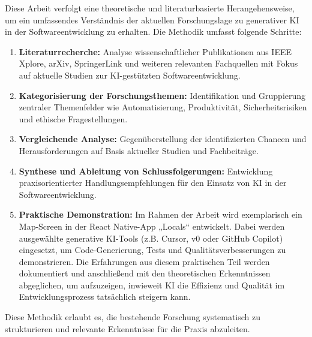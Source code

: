 Diese Arbeit verfolgt eine theoretische und literaturbasierte Herangehensweise, um ein umfassendes Verständnis der aktuellen Forschungslage zu generativer KI in der Softwareentwicklung zu erhalten. Die Methodik umfasst folgende Schritte:
\begin{enumerate}
    \item \textbf{Literaturrecherche:} Analyse wissenschaftlicher Publikationen aus IEEE Xplore, arXiv, SpringerLink und weiteren relevanten Fachquellen mit Fokus auf aktuelle Studien zur KI-gestützten Softwareentwicklung.
    \item \textbf{Kategorisierung der Forschungsthemen:} Identifikation und Gruppierung zentraler Themenfelder wie Automatisierung, Produktivität, Sicherheitsrisiken und ethische Fragestellungen.
    \item \textbf{Vergleichende Analyse:} Gegenüberstellung der identifizierten Chancen und Herausforderungen auf Basis aktueller Studien und Fachbeiträge.
    \item \textbf{Synthese und Ableitung von Schlussfolgerungen:} Entwicklung praxisorientierter Handlungsempfehlungen für den Einsatz von KI in der Softwareentwicklung.
    \item \textbf{Praktische Demonstration:} Im Rahmen der Arbeit wird exemplarisch ein Map-Screen in der React Native-App „Locals“ entwickelt. Dabei werden ausgewählte generative KI-Tools (z.B. Cursor, v0 oder GitHub Copilot) eingesetzt, um Code-Generierung, Tests und Qualitätsverbesserungen zu demonstrieren. Die Erfahrungen aus diesem praktischen Teil werden dokumentiert und anschließend mit den theoretischen Erkenntnissen abgeglichen, um aufzuzeigen, inwieweit KI die Effizienz und Qualität im Entwicklungsprozess tatsächlich steigern kann.
\end{enumerate}

Diese Methodik erlaubt es, die bestehende Forschung systematisch zu strukturieren und relevante Erkenntnisse für die Praxis abzuleiten.